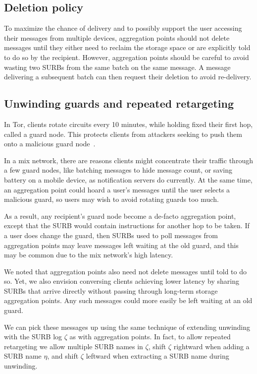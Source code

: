 \documentclass[twoside,letterpaper]{llncs}
\begin{document}
\subsection{Deletion policy}

To maximize the chance of delivery and to possibly support the user
accessing their messages from multiple devices, aggregation points
should not delete messages until they either need to reclaim the
storage space or are explicitly told to do so by the recipient.
However, aggregation points should be careful to avoid wasting two
SURBs from the same batch on the same message.  A message delivering a
subsequent batch can then request their deletion to avoid re-delivery.


\subsection{Unwinding guards and repeated retargeting}

In Tor, clients rotate circuits every 10 minutes, while holding
fixed their first hop, called a guard node.  This protects clients
from attackers seeking to push them onto a malicious guard
node~\cite{tor-guards}.

In a mix network, there are reasons clients might concentrate their
traffic through a few guard nodes, like batching messages to hide
message count, or saving battery on a mobile device, as notification
servers do currently.  At the same time, an aggregation point could
hoard a user's messages until the user selects a malicious guard,
so users may wish to avoid rotating guards too much.

As a result, any recipient's guard node become a de-facto aggregation
point, except that the SURB would contain instructions for another hop
to be taken.  If a user does change the guard, then SURBs used to poll
messages from aggregation points may leave messages left waiting at
the old guard, and this may be common due to the mix network's
high latency.

We noted that aggregation points also need not delete messages until
told to do so.  Yet, we also envision conversing clients achieving
lower latency by sharing SURBs that arrive directly without passing
through long-term storage aggregation points.  Any such messages could
more easily be left waiting at an old guard.

We can pick these messages up using the same technique of extending
unwinding with the SURB log $\zeta$ as with aggregation points.  In
fact, to allow repeated retargeting we allow multiple SURB names in
$\zeta$, shift $\zeta$ rightward when adding a SURB name $\eta$, and
shift $\zeta$ leftward when extracting a SURB name during unwinding.
\end{document}

